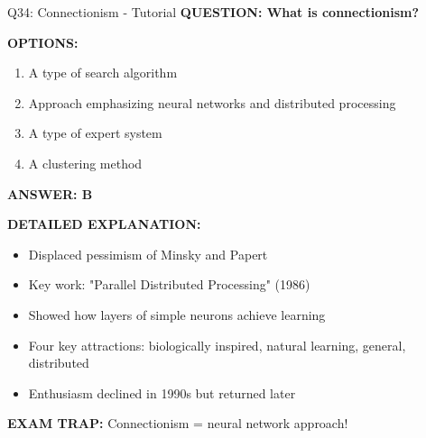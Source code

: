 \documentclass[8pt]{beamer}
\begin{document}
	\begin{frame}{Q34: Connectionism - Tutorial}
		\fontsize{6.5}{7.5}\selectfont
		\textbf{QUESTION: What is connectionism?}
		
		\vspace{0.1cm}
		\textbf{OPTIONS:}
		\begin{enumerate}
			\item A type of search algorithm
			\item Approach emphasizing neural networks and distributed processing
			\item A type of expert system
			\item A clustering method
		\end{enumerate}
		
		\vspace{0.1cm}
		\textcolor{myblue}{\textbf{ANSWER: B}}
		
		\vspace{0.1cm}
		\textbf{DETAILED EXPLANATION:}
		\begin{itemize}
			\item Displaced pessimism of Minsky and Papert
			\item Key work: "Parallel Distributed Processing" (1986)
			\item Showed how layers of simple neurons achieve learning
			\item Four key attractions: biologically inspired, natural learning, general, distributed
			\item Enthusiasm declined in 1990s but returned later
		\end{itemize}
		
		\vspace{0.1cm}
		\textcolor{myred}{\textbf{EXAM TRAP:}} Connectionism = \textcolor{myblue}{neural network approach}!
	\end{frame}
	
\end{document}
